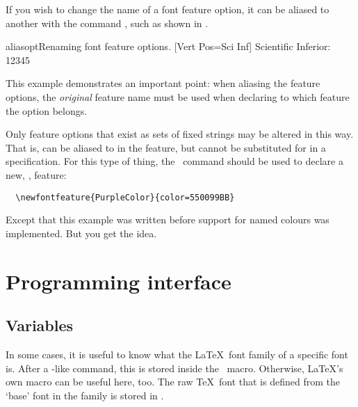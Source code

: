 \documentclass[a4paper]{l3doc}
\begin{document}
\DescribeMacro{\aliasfontfeatureoption}
If you wish to change the name of a font feature option,
it can be aliased to another with the command
, such as shown in .

\begin{Lexample}{aliasopt}{Renaming font feature options.}
  [Vert Pos=Sci Inf]
   Scientific Inferior: 12345
\end{Lexample}

This example demonstrates an important point: when aliasing the feature
options, the \emph{original} feature name must be used when declaring
to which feature the option belongs.

Only feature options that exist as sets of fixed strings may be altered in
this way. That is,  can be aliased to  in the
 feature, but  cannot be substituted for 
in a  specification. For this type of thing, the \cmd\newfontfeature\
command should be used to declare a new, \eg,  feature:
\begin{Verbatim}
  \newfontfeature{PurpleColor}{color=550099BB}
\end{Verbatim}
Except that this example was written before support for named colours was
implemented. But you get the idea.




\section{Programming interface}
\label{sec:api}


\subsection{Variables}

In some cases, it is useful to know what the \LaTeX\ font family
of a specific \pkg{fontspec} font is. After a \cmd\fontspec-like
command, this is stored inside the \cmd{\l_fontspec_family_tl}\ macro.
Otherwise, \LaTeX's own \cmd{\f@family} macro can be useful here,
too.
The raw \TeX\ font that is defined from the `base' font in the family is stored in .
\end{document}
